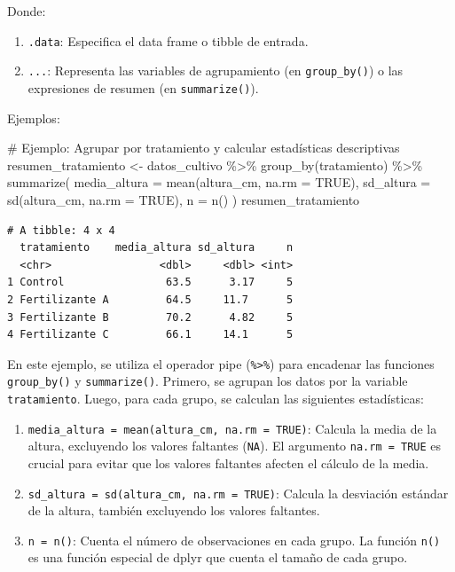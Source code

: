 \documentclass[
  spanish,
  a4paper,
  DIV=11,
  numbers=noendperiod,
  onepage,
  openany]{scrreprt}
\newenvironment{Shaded}{\begin{snugshade}}{\end{snugshade}}
\newcommand{\AttributeTok}[1]{\textcolor[rgb]{0.40,0.45,0.13}{#1}}
\newcommand{\CommentTok}[1]{\textcolor[rgb]{0.37,0.37,0.37}{#1}}
\newcommand{\ConstantTok}[1]{\textcolor[rgb]{0.56,0.35,0.01}{#1}}
\newcommand{\FunctionTok}[1]{\textcolor[rgb]{0.28,0.35,0.67}{#1}}
\newcommand{\NormalTok}[1]{\textcolor[rgb]{0.00,0.23,0.31}{#1}}
\newcommand{\OtherTok}[1]{\textcolor[rgb]{0.00,0.23,0.31}{#1}}
\newcommand{\SpecialCharTok}[1]{\textcolor[rgb]{0.37,0.37,0.37}{#1}}
\begin{document}
Donde:

\begin{enumerate}
\def\labelenumi{\arabic{enumi}.}
\item
  \texttt{.data}: Especifica el data frame o tibble de entrada.
\item
  \texttt{...}: Representa las variables de agrupamiento (en
  \texttt{group\_by()}) o las expresiones de resumen (en
  \texttt{summarize()}).
\end{enumerate}

Ejemplos:

\begin{Shaded}
\begin{Highlighting}[]
\CommentTok{\# Ejemplo: Agrupar por tratamiento y calcular estadísticas descriptivas}
\NormalTok{resumen\_tratamiento }\OtherTok{\textless{}{-}}\NormalTok{ datos\_cultivo }\SpecialCharTok{\%\textgreater{}\%}
    \FunctionTok{group\_by}\NormalTok{(tratamiento) }\SpecialCharTok{\%\textgreater{}\%}
    \FunctionTok{summarize}\NormalTok{(}
        \AttributeTok{media\_altura =} \FunctionTok{mean}\NormalTok{(altura\_cm, }\AttributeTok{na.rm =} \ConstantTok{TRUE}\NormalTok{),}
        \AttributeTok{sd\_altura =} \FunctionTok{sd}\NormalTok{(altura\_cm, }\AttributeTok{na.rm =} \ConstantTok{TRUE}\NormalTok{),}
        \AttributeTok{n =} \FunctionTok{n}\NormalTok{()}
\NormalTok{    )}
\NormalTok{resumen\_tratamiento}
\end{Highlighting}
\end{Shaded}

\begin{verbatim}
# A tibble: 4 x 4
  tratamiento    media_altura sd_altura     n
  <chr>                 <dbl>     <dbl> <int>
1 Control                63.5      3.17     5
2 Fertilizante A         64.5     11.7      5
3 Fertilizante B         70.2      4.82     5
4 Fertilizante C         66.1     14.1      5
\end{verbatim}

En este ejemplo, se utiliza el operador pipe
(\texttt{\%\textgreater{}\%}) para encadenar las funciones
\texttt{group\_by()} y \texttt{summarize()}. Primero, se agrupan los
datos por la variable \texttt{tratamiento}. Luego, para cada grupo, se
calculan las siguientes estadísticas:

\begin{enumerate}
\def\labelenumi{\arabic{enumi}.}
\item
  \texttt{media\_altura\ =\ mean(altura\_cm,\ na.rm\ =\ TRUE)}: Calcula
  la media de la altura, excluyendo los valores faltantes (\texttt{NA}).
  El argumento \texttt{na.rm\ =\ TRUE} es crucial para evitar que los
  valores faltantes afecten el cálculo de la media.
\item
  \texttt{sd\_altura\ =\ sd(altura\_cm,\ na.rm\ =\ TRUE)}: Calcula la
  desviación estándar de la altura, también excluyendo los valores
  faltantes.
\item
  \texttt{n\ =\ n()}: Cuenta el número de observaciones en cada grupo.
  La función \texttt{n()} es una función especial de dplyr que cuenta el
  tamaño de cada grupo.
\end{enumerate}
\end{document}
